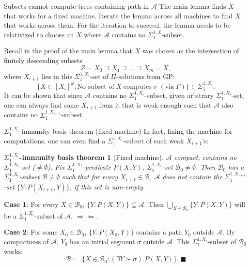 \begin{frame}{Subsets cannot compute trees containing path in $\mathcal{A}$}
  The main lemma finds $X$ that works for a fixed
  machine. Iterate the lemma across all machines to find $X$ that
  works across them. For the iteration to succeed, the lemma needs
  to be relativized to choose an $X$ where $\mathcal{A}$ contains no
  $\Sigma_1^{1,X}$-subset.

  \vspace{0.5em}
  Recall in the proof of the main lemma that $X$ was
  chosen as the intersection of finitely descending subsets
  \[Z=X_0 \supseteq X_1 \supseteq \ldots\supseteq X_m=X,\]
  where $X_{i+1}$ lies in this $\Sigma_1^{1,X_i}$-set of $\Pi$-solutions
  from GP:
  \[\{X\in[X_i]^\omega: \text{No subset of}\; X\; \text{computes}\;
  \sigma\; (\text{via}\; \Gamma)\} \in\Sigma_1^{1,X_i}.\]
  It can be shown that since $\mathcal{A}$ contains no
  $\Sigma_1^{1,X_i}$-subset, given arbitrary $\Sigma_1^{1,X_i}$-set, one
  can always find some $X_{i+1}$ from it that is weak enough such that
  $\mathcal{A}$ also contains no $\Sigma_1^{1,X_{i+1}}$-subset.
\end{frame}

\begin{frame}{$\Sigma_1^{1,X_i}$-immunity basis theorem (fixed machine)}
  In fact, fixing the machine for computations, one can even find a
  $\Sigma_1^{1,X_i}$-subset of such weak $X_{i+1}$'s:
  \newtheorem*{immunity*}{$\Sigma_1^{1,X_i}$-immunity basis theorem}
  \begin{immunity*}[Fixed machine]
    $\mathcal{A}$ compact, contains no $\Sigma_1^{1,X_i}$-set
    ($\neq\emptyset$). Fix $\Sigma_1^{1,X_i}$-predicate $P(X,Y)$,
    $\Sigma_1^{1,X_i}$-set $\mathcal{B}_0\neq\emptyset$. Then
    $\mathcal{B}_0$ has a $\Sigma_1^{1,X_i}$-subset
    $\mathcal{B}\neq\emptyset$ such that for every $X_{i+1}\in\mathcal{B}$,
    $\mathcal{A}$ does not contain the $\Sigma_1^{1,X_{i+1}}$-set
    $\{Y:P(X_{i+1},Y)\}$, if this set is non-empty.
  \end{immunity*}

  \textbf{Case 1}: For every $X\in\mathcal{B}_0$,
  $\{Y:P(X,Y)\}\subseteq\mathcal{A}$. Then $\bigcup_{X\in\mathcal{B}_0}
  \{Y:P(X,Y)\}$ will be a $\Sigma_1^{1,X_i}$-subset of $\mathcal{A}$,
  $\Rightarrow\Leftarrow$.

  \vspace{0.5em}
  \textbf{Case 2}: For some $X_0\in\mathcal{B}_0$, $\{Y:P(X_0,Y)\}$
  contains a path $Y_0$ outside $\mathcal{A}$. By compactness of
  $\mathcal{A}$, $Y_0$ has an initial segment $\sigma$ outside
  $\mathcal{A}$. This $\Sigma_1^{1,X_i}$-subset of $\mathcal{B}_0$ works:
  \[\mathcal{B}:= \{X\in\mathcal{B}_0: (\exists Y\succ\sigma)\; P(X,Y)\}.\;
  \blacksquare\]
\end{frame}

